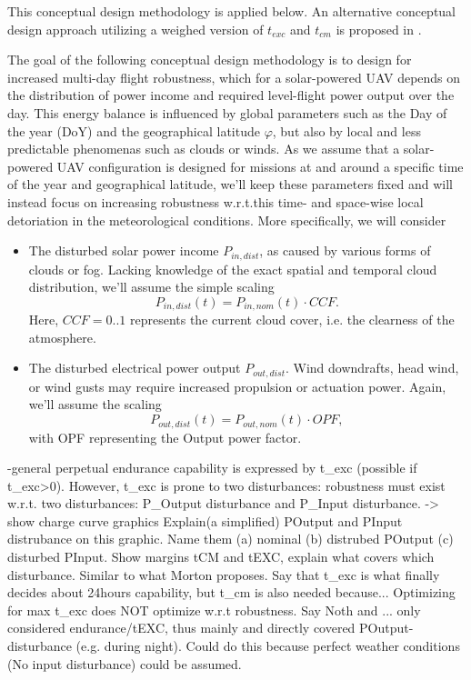 \documentclass[letterpaper, 10 pt, conference]{ieeeconf}  %
\begin{document}
This conceptual design methodology is applied below. An alternative conceptual design approach utilizing a weighed version of $t_{exc}$ and $t_{cm}$ is proposed in \cite{Morton_ICRA2013}. 








The goal of the following conceptual design methodology is to design for increased multi-day flight robustness, which for a solar-powered UAV depends on the distribution of power income and required level-flight power output over the day. This energy balance is influenced by global parameters such as the Day of the year (DoY) and the geographical latitude $\varphi$, but also by local and less predictable phenomenas such as clouds or winds. As we assume that a solar-powered UAV configuration is designed for missions at and around a specific time of the year and geographical latitude, we'll keep these parameters fixed and will instead focus on increasing robustness w.r.t.this time- and space-wise local detoriation in the meteorological conditions. More specifically, we will consider

 \begin{itemize}
\item The disturbed solar power income $P_{in,dist}$, as caused by various forms of clouds or fog. Lacking knowledge of the exact spatial and temporal cloud distribution, we'll assume the simple scaling $$ P_{in,dist}(t) = P_{in,nom}(t) \cdot CCF. $$ Here, $CCF=0..1$ \cite{Kimura_SolarRadAndClouds} represents the current cloud cover, i.e. the clearness of the atmosphere.
\item The disturbed electrical power output $P_{out,dist}$. Wind downdrafts, head wind, or wind gusts may require increased propulsion or actuation power. Again, we'll assume the scaling  $$ P_{out,dist}(t) = P_{out,nom}(t) \cdot OPF, $$ with OPF representing the Output power factor.
\end{itemize}

 -general perpetual endurance capability is expressed by t\_exc (possible if t\_exc>0). However, t\_exc is prone to two disturbances:
 robustness must exist w.r.t. two disturbances: P\_Output disturbance and P\_Input disturbance.
 -> show charge curve graphics
 Explain(a simplified) POutput and PInput distrubance on this graphic. Name them (a) nominal (b) distrubed POutput (c) disturbed PInput.
 Show margins tCM and tEXC, explain what covers which disturbance. Similar to what Morton proposes. Say that t\_exc is what finally decides about 24hours capability, but t\_cm is also needed because... Optimizing for max t\_exc does NOT optimize w.r.t robustness.
 Say Noth and ... only considered endurance/tEXC, thus mainly and directly covered POutput-disturbance (e.g. during night). Could do this because perfect weather conditions (No input disturbance) could be assumed.
 
\end{document}
